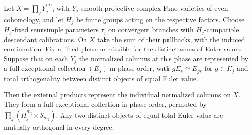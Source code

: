 \begin{proposition}\label{prop:product}
Let $X=\prod_j Y_j^{m_j}$, with $Y_j$ smooth projective complex Fano varieties of even cohomology, and let $H_j$ be finite groups acting on the respective factors. Choose $H_j$-fixed semisimple parameters $\tau_j$ on convergent branches with $H_j$-compatible descendant calibrations. On $X$ take the sum of their pullbacks, with the induced continuation. Fix a lifted phase admissible for the distinct sums of Euler values. Suppose that on each $Y_j$ the normalized columns at this phase are represented by a full exceptional collection $(E_s)$ in phase order, with $gE_s\simeq E_{gs}$ for $g\in H_j$ and total orthogonality between distinct objects of equal Euler value.

Then the external products represent the individual normalized columns on $X$. They form a full exceptional collection in phase order, permuted by $\prod_j(H_j^{m_j}\rtimes S_{m_j})$. Any two distinct objects of equal total Euler value are mutually orthogonal in every degree.
\end{proposition}
